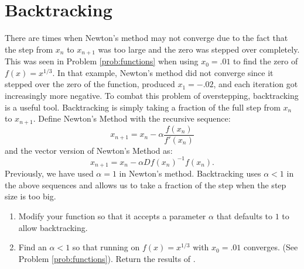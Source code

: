\section*{Backtracking}
There are times when Newton's method may not converge due to the fact that the step from $x_n$ to $x_{n+1}$ was too large and the zero was stepped over completely.  This was seen in Problem \ref{prob:functions} when using $x_0 = .01$ to find the zero of $f(x)=x^{1/3}$. In that example, Newton's method did not converge since it stepped over the zero of the function, produced $x_1 = -.02$, and each iteration got increasingly more negative.  To combat this problem of overstepping, backtracking is a useful tool.  Backtracking is simply taking a fraction of the full step from $x_n$ to $x_{n+1}$.  Define Newton's Method with the recursive sequence:
\[
x_{n+1} = x_n - \alpha\frac{f(x_n)}{f'(x_n)}
\]
and the vector version of Newton's Method as:
\[
x_{n+1} = x_n - \alpha{Df(x_n)}^{-1}{f(x_n)}.
\]
Previously, we have used $\alpha = 1$ in Newton's method.  Backtracking uses $\alpha < 1$ in the above sequences and allows us to take a fraction of the step when the step size is too big.
\begin{problem}
\begin{enumerate}

\item Modify your  function so that it accepts a parameter $\alpha$ that defaults to $1$ to allow backtracking.
\item Find an $\alpha < 1$ so that running  on $f(x)=x^{1/3}$ with $x_0=.01$ converges.  
(See Problem \ref{prob:functions}).
Return the results of .


\end{enumerate}
\end{problem}

